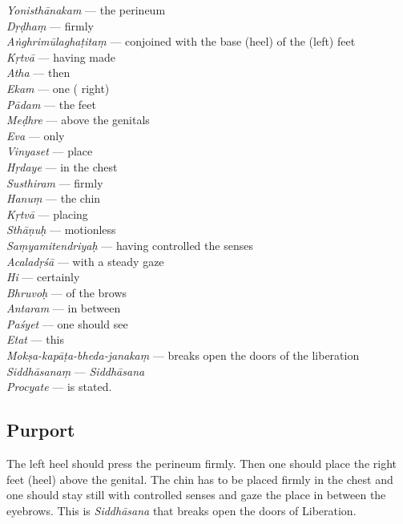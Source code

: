\begin{multicols}{2}
\textit{Yonisthānakam} --- the perineum \\
\textit{Dṛḍhaṃ} --- firmly  \\
\textit{Aṅghrimūlaghaṭitaṃ} --- conjoined with the base (heel) of the (left) feet  \\
\textit{Kṛtvā} --- having made \\
\textit{Atha} --- then\\
\textit{Ekam} --- one ( right)  \\
\textit{Pādam} --- the feet \\
\textit{Meḍhre} --- above the genitals \\
\textit{Eva} --- only \\
\textit{Vinyaset} --- place \\
\textit{Hṛdaye} --- in the chest \\
\textit{Susthiram} --- firmly \\
\textit{Hanuṃ} --- the chin \\
\textit{Kṛtvā} --- placing \\
\textit{Sthāṇuḥ} --- motionless\\
\textit{Saṃyamitendriyaḥ} --- having controlled the senses  \\
\textit{Acaladṛśā}  --- with a  steady gaze  \\
\textit{Hi} --- certainly \\
\textit{Bhruvoḥ} --- of the brows  \\
\textit{Antaram}  --- in between \\
\textit{Paśyet} --- one should see \\
\textit{Etat} --- this  \\
\textit{Mokṣa-kapāṭa-bheda-janakaṃ} --- breaks open the doors of the liberation \\
\textit{Siddhāsanaṃ} --- \textit{Siddhāsana} \\
\textit{Procyate} --- is stated. 
\end{multicols}

\subsection*{Purport}

The left heel should press the perineum firmly. Then one should place the right feet (heel) above the genital.  The chin has to be placed firmly in the chest and one should stay still with controlled senses and gaze the place in between the eyebrows. This is \textit{Siddhāsana} that breaks open the doors of Liberation.

